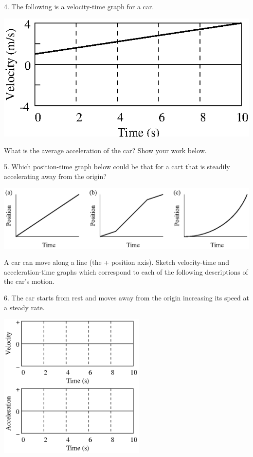 4. The following is a velocity-time graph for a car.

\vspace{0.3cm}
{\par\centering \includegraphics{changing/changing_fig10.eps} \par}
\vspace{0.3cm}

What is the average acceleration of the car? Show your work below.
\answerspace{30mm}

5. Which position-time graph below could be that for a cart that is steadily
accelerating away from the origin?

\vspace{0.3cm}
{\par\centering \includegraphics{changing/changing_fig11.eps} \par}
\vspace{0.3cm}

\pagebreak[2]
A car can move along a line (the + position axis). Sketch velocity-time and
acceleration-time graphs which correspond to each of the following descriptions
of the car's motion.

6. The car starts from rest and moves away from the origin increasing its speed
at a steady rate.

\vspace{0.3cm}
{\par\centering \includegraphics[width=0.55\textwidth]{changing/changing_fig12.eps} \par}
\answerspace{0.3cm}

